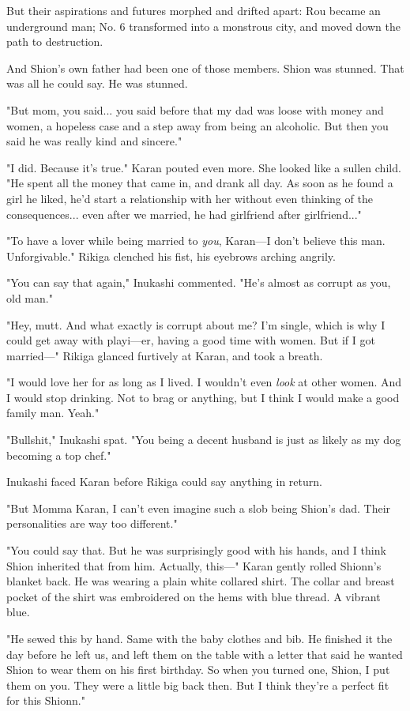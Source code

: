 But their aspirations and futures morphed and drifted apart: Rou became
an underground man; No. 6 transformed into a monstrous city, and moved
down the path to destruction.

And Shion's own father had been one of those members. Shion was stunned.
That was all he could say. He was stunned.

"But mom, you said... you said before that my dad was loose with money
and women, a hopeless case and a step away from being an alcoholic. But
then you said he was really kind and sincere."

"I did. Because it's true." Karan pouted even more. She looked like a
sullen child. "He spent all the money that came in, and drank all day.
As soon as he found a girl he liked, he'd start a relationship with her
without even thinking of the consequences... even after we married, he
had girlfriend after girlfriend..."

"To have a lover while being married to \emph{you}, Karan---I don't believe this
man. Unforgivable." Rikiga clenched his fist, his eyebrows arching
angrily.

"You can say that again," Inukashi commented. "He's almost as corrupt as
you, old man."

"Hey, mutt. And what exactly is corrupt about me? I'm single, which is
why I could get away with playi---er, having a good time with women. But
if I got married---" Rikiga glanced furtively at Karan, and took a breath.

"I would love her for as long as I lived. I wouldn't even \emph{look} at other
women. And I would stop drinking. Not to brag or anything, but I think I
would make a good family man. Yeah."

"Bullshit," Inukashi spat. "You being a decent husband is just as likely
as my dog becoming a top chef."

Inukashi faced Karan before Rikiga could say anything in return.

"But Momma Karan, I can't even imagine such a slob being Shion's dad.
Their personalities are way too different."

"You could say that. But he was surprisingly good with his hands, and I
think Shion inherited that from him. Actually, this---" Karan gently
rolled Shionn's blanket back. He was wearing a plain white collared
shirt. The collar and breast pocket of the shirt was embroidered on the
hems with blue thread. A vibrant blue.

"He sewed this by hand. Same with the baby clothes and bib. He finished
it the day before he left us, and left them on the table with a letter
that said he wanted Shion to wear them on his first birthday. So when
you turned one, Shion, I put them on you. They were a little big back
then. But I think they're a perfect fit for this Shionn."


